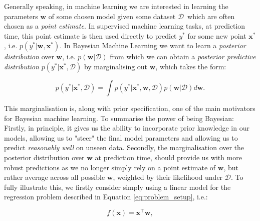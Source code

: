 


\noindent Generally speaking, in machine learning we are interested in learning the parameters $\mathbf{w}$ of some chosen model given some dataset $\mathcal{D}$\, which are often chosen as a \textit{point estimate}. In supervised machine learning tasks, at prediction time, this point estimate is then used directly to predict $y^*$ for some new point $\mathbf{x}^*$, i.e. $p(y^*|\mathbf{w}, \mathbf{x}^*)$. In Bayesian Machine Learning we want to learn a \textit{posterior distribution} over $\mathbf{w}$, i.e. $p(\mathbf{w}|\mathcal{D})$ from which we can obtain a \textit{posterior predictive distribution} $p(y^*|\mathbf{x}^*, \mathcal{D})$ by marginalising out $\mathbf{w}$, which takes the form:

\begin{equation}
    p(y^*|\mathbf{x}^*, \mathcal{D}) = \int p(y^*|\mathbf{x}^*, \mathbf{w}, \mathcal{D})p(\mathbf{w}|\mathcal{D})d\mathbf{w}.
\end{equation}

\noindent This marginalisation is, along with prior specification, one of the main motivators for Bayesian machine learning. To summarise the power of being Bayesian: Firstly, in principle, it gives us the ability to incorporate prior knowledge in our models, allowing us to "steer" the final model parameters and allowing us to predict \textit{reasonably well} on unseen data. Secondly, the marginalisation over the posterior distribution over $\mathbf{w}$ at prediction time, should provide us with more robust predictions as we no longer simply rely on a point estimate of $\mathbf{w}$, but rather average across all possible $\mathbf{w}$, weighted by their likelihood under $\mathcal{D}$. To fully illustrate this, we firstly consider simply using a linear model for the regression problem described in Equation \ref{eq:problem_setup}, i.e.:

\begin{equation}
    f(\mathbf{x}) = \mathbf{x}^\top\mathbf{w},
    \label{eq:lin_model}
\end{equation}

